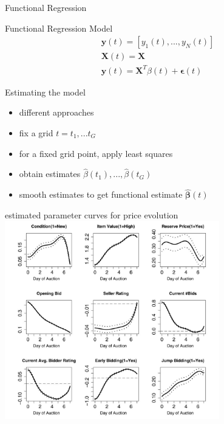 \documentclass[hyperref={pdfpagelabels=false}]{beamer}
\begin{document}
\begin{frame}
\centering
Functional Regression
\end{frame}


\begin{frame}{Functional Regression Model} %
\begin{align}
\mathbf{y}(t) = [y_1(t),...,y_N(t)] \nonumber \\ \mathbf{X}(t)=\mathbf{X} \nonumber \\ \mathbf{y}(t)=\mathbf{X}^T\beta(t)+\mathbf{\epsilon}(t) \nonumber 
\end{align}
\end{frame}

\begin{frame}{Estimating the model} %
\begin{itemize}
\item different approaches
\item fix a grid $t=t_1,...t_G$
\item for a fixed grid point, apply least squares
\item obtain estimates $\hat{\beta}(t_1),...,\hat{\beta}(t_G)$ 
\item smooth estimates to get functional estimate $\mathbf{\hat{\pmb{\beta}}}(t)$ 
\end{itemize}
\end{frame}

\begin{frame}{estimated parameter curves for price evolution} %
\center
\includegraphics[width=0.7\textwidth]{price_evolution}
\end{frame}
\end{document}

